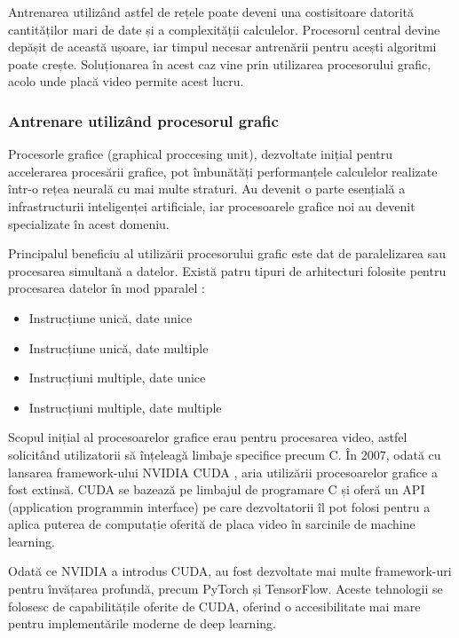 \documentclass[a4paper, 12pt]{report}
\begin{document}
	Antrenarea utilizând astfel de rețele poate deveni una costisitoare datorită cantităților mari de date și a complexității calculelor. Procesorul central devine depășit de această ușoare, iar timpul necesar antrenării pentru acești algoritmi poate crește. Soluționarea în acest caz vine prin utilizarea procesorului grafic, acolo unde placă video permite acest lucru.
	
	\clearpage
	\subsubsection{Antrenare utilizând procesorul grafic}
	Procesorle grafice (graphical proccesing unit), dezvoltate inițial pentru accelerarea procesării grafice, pot îmbunătăți performanțele calculelor realizate într-o rețea neurală cu mai multe straturi. Au devenit o parte esențială a  infrastructurii inteligenței artificiale, iar procesoarele grafice noi au devenit specializate în acest domeniu.
	
	Principalul beneficiu al utilizării procesorului grafic este dat de paralelizarea sau procesarea simultană a datelor. Există patru tipuri de arhitecturi folosite pentru procesarea datelor în mod pparalel :
	
	\begin{itemize}
		\item Instrucțiune unică, date unice
		\item Instrucțiune unică, date multiple
		\item Instrucțiuni multiple, date unice
		\item Instrucțiuni multiple, date multiple
	\end{itemize}
	
	Scopul inițial al procesoarelor grafice erau pentru procesarea video, astfel solicitând utilizatorii să înțeleagă limbaje specifice precum C. În 2007, odată cu lansarea framework-ului NVIDIA CUDA \cite{cuda}, aria utilizării procesoarelor grafice a fost extinsă. CUDA se bazează pe limbajul de programare C și oferă un API (application programmin interface) pe care dezvoltatorii îl pot folosi pentru a aplica puterea de computație oferită de placa video în sarcinile de machine learning.
	
	Odată ce NVIDIA a introdus CUDA, au fost dezvoltate mai multe framework-uri pentru învățarea profundă, precum PyTorch și TensorFlow. Aceste tehnologii se folosesc de capabilitățile oferite de CUDA, oferind o accesibilitate mai mare pentru implementările moderne de deep learning.
	
\end{document}
